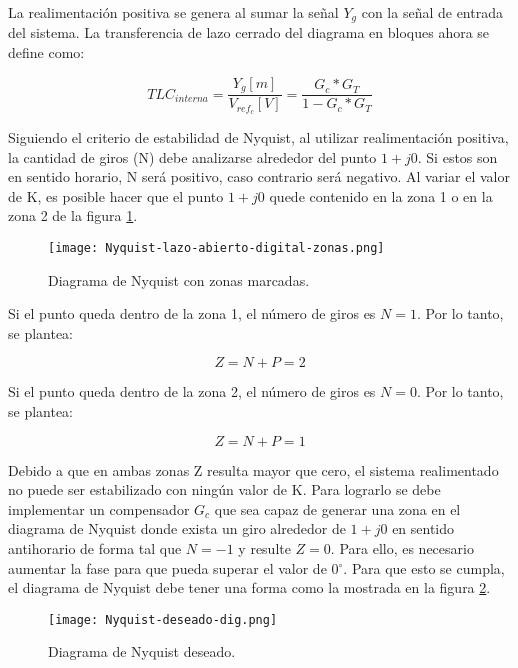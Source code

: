 La realimentación positiva se genera al sumar la señal $Y_g$ con la señal de entrada del sistema. La transferencia de lazo cerrado del diagrama en bloques ahora se define como:

\begin{equation}
	TLC_{interna}=\frac{Y_g[m]}{V_{ref_c}[V]}=\frac{G_c*G_T}{1-G_c*G_T}
\end{equation}

Siguiendo el criterio de estabilidad de Nyquist, al utilizar realimentación positiva, la cantidad de giros (N) debe analizarse alrededor del punto $1+j0$. Si estos son en sentido horario, N será positivo, caso contrario será negativo. Al variar el valor de K, es posible hacer que el punto $1+j0$ quede contenido en la zona 1 o en la zona 2 de la figura \ref{fig:nyquist-con-zonas_digital}. 

\begin{figure}[H]
	\centering
	\texttt{[image: Nyquist-lazo-abierto-digital-zonas.png]}
	\caption{Diagrama de Nyquist con zonas marcadas.}
	\label{fig:nyquist-con-zonas_digital}
\end{figure}

Si el punto queda dentro de la zona 1, el número de giros es $N=1$. Por lo tanto, se plantea:

\begin{equation*}
	Z = N + P = 2
\end{equation*}


Si el punto queda dentro de la zona 2, el número de giros es $N=0$. Por lo tanto, se plantea:

\begin{equation*}
	Z = N + P = 1
\end{equation*}

Debido a que en ambas zonas Z resulta mayor que cero, el sistema realimentado no puede ser estabilizado con ningún valor de K. Para lograrlo se debe implementar un compensador $G_c$ que sea capaz de generar una zona en el diagrama de Nyquist donde exista un giro alrededor de $1 + j0$ en sentido antihorario de forma tal que $N=-1$ y resulte $Z=0$. Para ello, es necesario aumentar la fase para que pueda superar el valor de 0$\mathrm{{}^\circ}$. Para que esto se cumpla, el diagrama de Nyquist debe tener una forma como la  mostrada en la figura \ref{fig:nyquist-deseado-dig}.

\begin{figure}[H]
	\centering
	\texttt{[image: Nyquist-deseado-dig.png]}
	\caption{Diagrama de Nyquist deseado.}
	\label{fig:nyquist-deseado-dig}
\end{figure}

